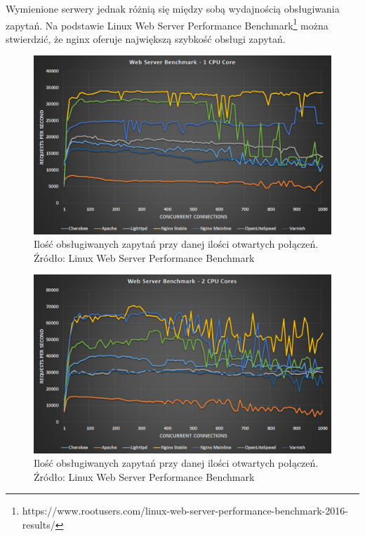 \documentclass[eng]{mgr}
\begin{document}
			Wymienione serwery jednak różnią się między sobą wydajnością obsługiwania zapytań. Na podstawie Linux Web Server Performance Benchmark\footnote{https://www.rootusers.com/linux-web-server-performance-benchmark-2016-results/} można stwierdzić, że nginx oferuje największą szybkość obsługi zapytań.
	
			\begin{center}
				\begin{figure}[ht]
					\centering
					\includegraphics[scale=0.35]{web-server-performance-benchmark-1-cpu-core-1.jpg}
					\caption{Ilość obsługiwanych zapytań przy danej ilości otwartych połączeń. Źródło: Linux Web Server Performance Benchmark}
				\end{figure}
			\end{center}

			\begin{center}
				\begin{figure}[ht]
					\centering
					\includegraphics[scale=0.35]{web-server-performance-benchmark-2-cpu-cores-2.jpg}
					\caption{Ilość obsługiwanych zapytań przy danej ilości otwartych połączeń. Źródło: Linux Web Server Performance Benchmark}
				\end{figure}
			\end{center}
		
\end{document}
